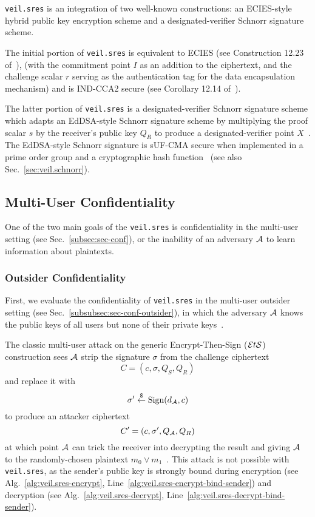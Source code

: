 \texttt{veil.sres} is an integration of two well-known constructions: an ECIES-style hybrid public key encryption scheme
and a designated-verifier Schnorr signature scheme.

The initial portion of \texttt{veil.sres} is equivalent to ECIES (see Construction 12.23 of~\cite[p. 435]{katz2020}),
(with the commitment point $I$ as an addition to the ciphertext, and the challenge scalar $r$ serving as the
authentication tag for the data encapsulation mechanism) and is IND-CCA2 secure (see Corollary 12.14
of~\cite[p. 436]{katz2020}).

The latter portion of \texttt{veil.sres} is a designated-verifier Schnorr signature scheme which adapts an EdDSA-style
Schnorr signature scheme by multiplying the proof scalar $s$ by the receiver's public key $Q_R$ to produce a
designated-verifier point $X$~\cite{steinfeld2004}.
The EdDSA-style Schnorr signature is sUF-CMA secure when implemented in a prime order
group and a cryptographic hash function~\cite{brendel2021, chalkias2020, pointcheval2000, neven2009}
(see also Sec.~\ref{sec:veil.schnorr}).

\subsection{Multi-User Confidentiality}\label{subsec:veil.sres-conf}

One of the two main goals of the \texttt{veil.sres} is confidentiality in the multi-user setting
(see Sec.~\ref{subsec:sec-conf}), or the inability of an adversary $\mathcal{A}$ to learn information about plaintexts.

\subsubsection{Outsider Confidentiality}

First, we evaluate the confidentiality of \texttt{veil.sres} in the multi-user outsider setting
(see Sec.~\ref{subsubsec:sec-conf-outsider}), in which the adversary $\mathcal{A}$ knows the public keys of all users but
none of their private keys~\cite[p. 44]{baek2010}.

The classic multi-user attack on the generic Encrypt-Then-Sign ($\mathcal{E}t\mathcal{S}$) construction sees $\mathcal{A}$ strip the
signature $\sigma$ from the challenge ciphertext
\[
    C=(c,\sigma,Q_S,Q_R)
\]
and replace it with
\[
    \sigma' \stackrel{\$}{\gets} \text{Sign}(d_{\mathcal{A}},c)
\]
to produce an attacker ciphertext
\[
    C'=(c,\sigma',Q_{\mathcal{A}},Q_R)
\]
at which point $\mathcal{A}$ can trick the receiver into decrypting the result and giving $\mathcal{A}$ to the
randomly-chosen plaintext $m_0 \lor m_1$~\cite[p. 40]{an2010}.
This attack is not possible with \texttt{veil.sres}, as the sender's public key is strongly bound during
encryption (see Alg.~\ref{alg:veil.sres-encrypt}, Line~\ref{alg:veil.sres-encrypt-bind-sender}) and decryption
(see Alg.~\ref{alg:veil.sres-decrypt}, Line~\ref{alg:veil.sres-decrypt-bind-sender}).

